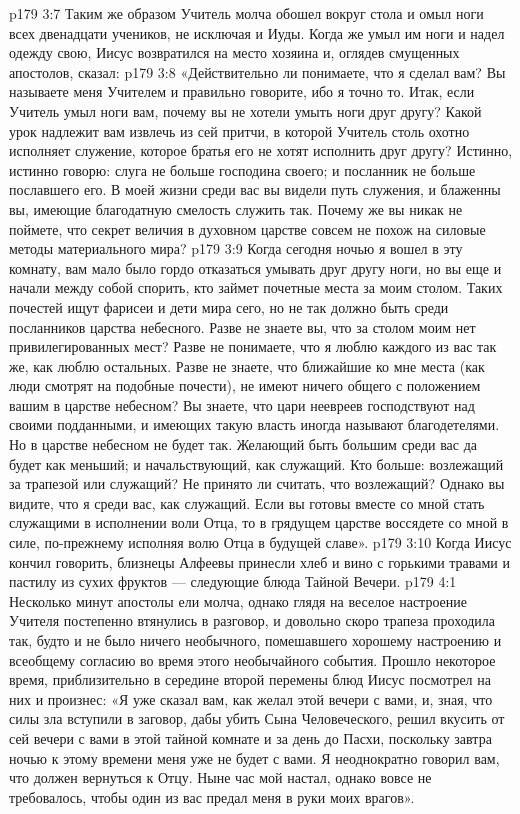 \vs p179 3:7 Таким же образом Учитель молча обошел вокруг стола и омыл ноги всех двенадцати учеников, не исключая и Иуды. Когда же умыл им ноги и надел одежду свою, Иисус возвратился на место хозяина и, оглядев смущенных апостолов, сказал:
\vs p179 3:8 \pc «Действительно ли понимаете, что я сделал вам? Вы называете меня Учителем и правильно говорите, ибо я точно то. Итак, если Учитель умыл ноги вам, почему вы не хотели умыть ноги друг другу? Какой урок надлежит вам извлечь из сей притчи, в которой Учитель столь охотно исполняет служение, которое братья его не хотят исполнить друг другу? Истинно, истинно говорю: слуга не больше господина своего; и посланник не больше пославшего его. В моей жизни среди вас вы видели путь служения, и блаженны вы, имеющие благодатную смелость служить так. Почему же вы никак не поймете, что секрет величия в духовном царстве совсем не похож на силовые методы материального мира?
\vs p179 3:9 Когда сегодня ночью я вошел в эту комнату, вам мало было гордо отказаться умывать друг другу ноги, но вы еще и начали между собой спорить, кто займет почетные места за моим столом. Таких почестей ищут фарисеи и дети мира сего, но не так должно быть среди посланников царства небесного. Разве не знаете вы, что за столом моим нет привилегированных мест? Разве не понимаете, что я люблю каждого из вас так же, как люблю остальных. Разве не знаете, что ближайшие ко мне места (как люди смотрят на подобные почести), не имеют ничего общего с положением вашим в царстве небесном? Вы знаете, что цари неевреев господствуют над своими подданными, и имеющих такую власть иногда называют благодетелями. Но в царстве небесном не будет так. Желающий быть большим среди вас да будет как меньший; и начальствующий, как служащий. Кто больше: возлежащий за трапезой или служащий? Не принято ли считать, что возлежащий? Однако вы видите, что я среди вас, как служащий. Если вы готовы вместе со мной стать служащими в исполнении воли Отца, то в грядущем царстве воссядете со мной в силе, по\hyp{}прежнему исполняя волю Отца в будущей славе».
\vs p179 3:10 Когда Иисус кончил говорить, близнецы Алфеевы принесли хлеб и вино с горькими травами и пастилу из сухих фруктов --- следующие блюда Тайной Вечери.
\vs p179 4:1 Несколько минут апостолы ели молча, однако глядя на веселое настроение Учителя постепенно втянулись в разговор, и довольно скоро трапеза проходила так, будто и не было ничего необычного, помешавшего хорошему настроению и всеобщему согласию во время этого необычайного события. Прошло некоторое время, приблизительно в середине второй перемены блюд Иисус посмотрел на них и произнес: «Я уже сказал вам, как желал этой вечери с вами, и, зная, что силы зла вступили в заговор, дабы убить Сына Человеческого, решил вкусить от сей вечери с вами в этой тайной комнате и за день до Пасхи, поскольку завтра ночью к этому времени меня уже не будет с вами. Я неоднократно говорил вам, что должен вернуться к Отцу. Ныне час мой настал, однако вовсе не требовалось, чтобы один из вас предал меня в руки моих врагов».
